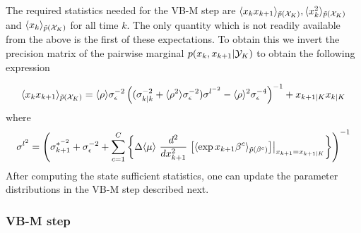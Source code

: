 \documentclass{article}
\begin{document}
The required statistics needed for the VB-M step are $\langle x_kx_{k+1} \rangle_{\tilde{p}(\mathcal{X}_K)},
\langle x_k^2 \rangle_{\tilde{p}(\mathcal{X}_K)}$ and $\langle x_k \rangle_{\tilde{p}(\mathcal{X}_K)}$ for all time $k$. The only
quantity which is not readily available from the above is the first of these expectations. To obtain
this we invert the precision matrix of the pairwise marginal $p(x_k,x_{k+1}|\mathcal{Y}_K)$ to obtain the following expression

\begin{equation} \langle x_kx_{k+1} \rangle_{\tilde{p}(\mathcal{X}_K)} = \langle \rho \rangle \sigma^{-2}_\epsilon\left((\sigma^{-2}_{k|k} + \langle \rho^2 \rangle \sigma^{-2}_\epsilon)\sigma^{l^{-2}} - \langle \rho \rangle^2 \sigma_\epsilon^{-4} \right)^{-1}+ x_{k+1|K}x_{k|K}
\end{equation}
\noindent where \begin{equation} \sigma^{l^{2}} = \left(\sigma^{*^{-2}}_{k+1} +
	\sigma^{-2}_\epsilon + \sum_{c=1}^C \left\{\Delta \langle \mu \rangle \
	\frac{d^2}{dx_{k+1}^2}\left.\left[\langle \exp{x_{k+1}\beta^c}
	\rangle_{\tilde{p}(\beta^c)}\right]\right|_{x_{k+1} = x_{k+1|K}} \right\} \right)^{-1}
\end{equation} After computing the state sufficient statistics, one can update the parameter
distributions in the VB-M step described next.

\subsubsection{VB-M step}\label{sec:VBM}
\end{document}

